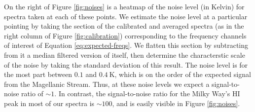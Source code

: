 \documentclass[12pt]{article}
\begin{document}
On the right of Figure \ref{fig:noises} is a heatmap of the noise level (in Kelvin) for spectra taken at each of these points. We estimate the noise level at a particular pointing by taking the section of the calibrated and averaged spectra (as in the right column of Figure \ref{fig:calibration}) corresponding to the frequency channels of interest of Equation \ref{eq:expected-freqs}. We flatten this section by subtracting from it a median filtered version of itself, then determine the characterstic scale of the noise by taking the standard deviation of this result. The noise level is for the most part between $0.1$ and $0.4\ \mathrm{K}$, which is on the order of the expected signal from the Magellanic Stream. Thus, at these noise levels we expect a signal-to-noise ratio of $\sim1$. In contrast, the signal-to-noise ratio for the Milky Way's HI peak in most of our spectra is $\sim100$, and is easily visible in Figure \ref{fig:noises}. 
\end{document}
